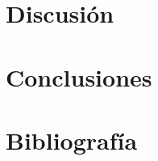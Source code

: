 \documentclass[runningheads]{llncs}
\begin{document}
    \section{Discusión}
    \section{Conclusiones}

    \section*{Bibliografía}
\end{document}
